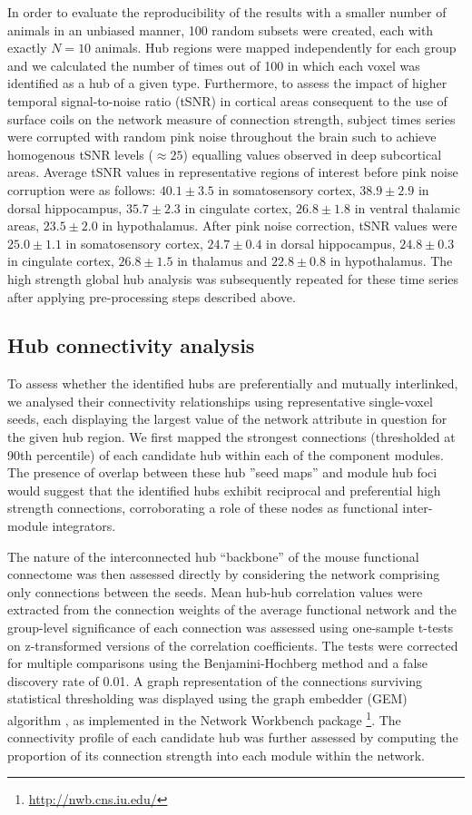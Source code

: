 In order to evaluate the reproducibility of the results with a smaller number of
animals in an unbiased manner, 100 random subsets were created, each with
exactly $N=10$ animals. Hub regions were mapped independently for each group and
we calculated the number of times out of 100 in which each voxel was identified
as a hub of a given type. Furthermore, to assess the impact of higher temporal
signal-to-noise ratio (tSNR) in cortical areas consequent to the use of surface
coils \parencite{kalthoff2011} on the network measure of connection strength,
subject times series were corrupted with random pink noise throughout the brain
such to achieve homogenous tSNR levels ($\approx 25$) equalling values observed
in deep subcortical areas. Average tSNR values in representative regions of
interest before pink noise corruption were as follows: $40.1\pm3.5$ in
somatosensory cortex, $38.9\pm2.9$ in dorsal hippocampus, $35.7\pm2.3$ in
cingulate cortex, $26.8\pm1.8$ in ventral thalamic areas, $23.5\pm2.0$ in
hypothalamus. After pink noise correction, tSNR values were $25.0\pm1.1$ in
somatosensory cortex, $24.7\pm0.4$ in dorsal hippocampus, $24.8\pm0.3$ in
cingulate cortex, $26.8\pm1.5$ in thalamus and $22.8\pm0.8$ in hypothalamus. The
high strength global hub analysis was subsequently repeated for these time
series after applying pre-processing steps described above.

\subsection{Hub connectivity analysis}
To assess whether the identified hubs are preferentially and mutually
interlinked, we analysed their connectivity relationships using representative
single-voxel seeds, each displaying the largest value of the network attribute
in question for the given hub region. We first mapped the strongest connections
(thresholded at 90th percentile) of each candidate hub within each of the
component modules. The presence of overlap between these hub ''seed maps'' and
module hub foci would suggest that the identified hubs exhibit reciprocal and
preferential high strength connections, corroborating a role of these nodes as
functional inter-module integrators. 

The nature of the interconnected hub ``backbone'' of the mouse functional
connectome was then assessed directly by considering the network comprising only
connections between the seeds. Mean hub-hub correlation values were extracted
from the connection weights of the average functional network and the
group-level significance of each connection was assessed using one-sample
t-tests on z-transformed versions of the correlation coefficients. The tests
were corrected for multiple comparisons using the Benjamini-Hochberg method and
a false discovery rate of 0.01. A graph representation of the connections
surviving statistical thresholding was displayed using the graph embedder (GEM)
algorithm \parencite{frick1994}, as implemented in the Network Workbench package
\footnote{\url{http://nwb.cns.iu.edu/}}. The connectivity profile of each candidate hub
was further assessed by computing the proportion of its connection strength into
each module within the network.

